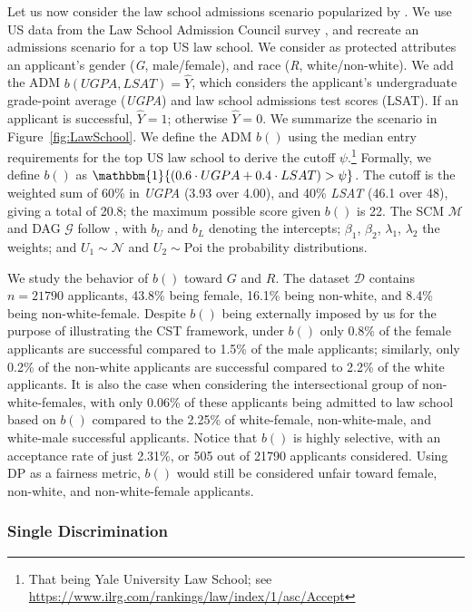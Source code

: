 Let us now consider the law school admissions scenario popularized by \textcite[Figure 2]{Kusner2017CF}.
We use US data from the Law School Admission Council survey \parencite{Wightman1998_LawDataSource}, and recreate an admissions scenario for a top US law school. 
We consider as protected attributes an applicant's gender (\textit{G}, male/female), and race (\textit{R}, white/non-white). 
We add the ADM $b(UGPA, LSAT) = \hat{Y}$, which considers the applicant's undergraduate grade-point average (\textit{UGPA}) and law school admissions test scores (LSAT). 
If an applicant is successful, $\widehat{Y}=1$; otherwise $\widehat{Y}=0$. 
We summarize the scenario in Figure~\ref{fig:LawSchool}.
We define the ADM $b()$ using the median entry requirements for the top US law school to derive the cutoff $\psi$.\footnote{That being Yale University Law School; see \url{https://www.ilrg.com/rankings/law/index/1/asc/Accept}}
Formally, we define $b()$ as $\mathbbm{1}\{(0.6 \cdot UGPA + 0.4 \cdot LSAT) > \psi\}$.
The cutoff is the weighted sum of 60\%  in \textit{UGPA} (3.93 over 4.00), and 40\%  \textit{LSAT} (46.1 over 48), giving a total of 20.8; the maximum possible score given $b()$ is 22. 
The SCM $\mathcal{M}$ and DAG $\mathcal{G}$ follow \textcite{Kusner2017CF},
with $b_U$ and $b_L$ denoting the intercepts; $\beta_1$, $\beta_2$, $\lambda_1$, $\lambda_2$ the weights; and $U_1 \sim \mathcal{N}$ and $U_2 \sim \text{Poi}$ the probability distributions.

We study the behavior of $b()$ toward $G$ and $R$.
The dataset $\mathcal{D}$ contains $n=21790$ applicants, 43.8\% being female, 16.1\% being non-white, and 8.4\% being non-white-female.
%
Despite $b()$ being externally imposed by us for the purpose of illustrating the CST framework, under $b()$ only 0.8\% of the female applicants are successful compared to 1.5\% of the male applicants; similarly, only 0.2\% of the non-white applicants are successful compared to 2.2\% of the white applicants.
It is also the case when considering the intersectional group of non-white-females, with only 0.06\% of these applicants being admitted to law school based on $b()$ compared to the 2.25\% of white-female, non-white-male, and white-male successful applicants.
Notice that $b()$ is highly selective, with an acceptance rate of just 2.31\%, or 505 out of 21790 applicants considered.
Using DP as a fairness metric, $b()$ would still be considered unfair toward female, non-white, and non-white-female applicants.

\subsubsection{Single Discrimination}
\label{sec:Experiments.Real.Single}

